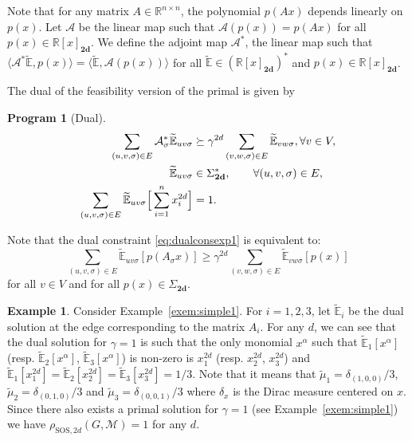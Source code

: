 \documentclass{sig-alternate-05-2015}
\newcommand{\1}{\mathbf{1}}
\newcommand{\Shs}{\Sigma_{\mathbf{2d}}^*}
\newcommand{\la}{\langle}
\newcommand{\ra}{\rangle}
\theoremstyle{definition}
\newtheorem{myexem}{Example}
\newtheorem{myprog}{Program}
\newcommand{\R}{\mathbb{R}}
\newcommand{\A}{\mathcal{M}}
\newcommand{\G}{G}
\newcommand{\jsrsos}[1][2d]{\rho_{\mathrm{SOS},#1}(\G,\A)}
\newcommand{\pE}{\widetilde{\mathbb{E}}}
\newcommand{\pmu}{\widetilde{\mu}}
\newcommand{\Nodes}{V}
\newcommand{\Arcs}{E}
\newcommand{\arc}{edge}
\begin{document}
Note that for any matrix $A \in \R^{n \times n}$, the polynomial $p(A x)$ depends linearly on $p(x)$.
Let $\mathcal{A}$ be the linear map such that $\mathcal{A}(p(x)) = p(Ax)$ for all $p(x) \in \R[x]_{\mathbf{2d}}$.
We define the adjoint map $\mathcal{A}^*$,
the linear map such that $\la \mathcal{A}^* \pE, p(x) \ra = \la \pE, \mathcal{A}(p(x)) \ra$ for all $\pE \in (\R[x]_{\mathbf{2d}})^*$ and $p(x) \in \R[x]_{\mathbf{2d}}$.

The dual of the feasibility version of the primal is given by
\begin{myprog}[Dual]
  \label{prog:dual}
  \begin{align}
    \label{eq:dualconsexp1}
    \sum_{(u,v,\sigma) \in E} \mathcal{A}_\sigma^* \pE_{uv\sigma} & \succeq \gamma^{2d} \sum_{(v,w,\sigma) \in \Arcs} \pE_{vw\sigma}, \forall v \in \Nodes,\\
    \notag
    \pE_{uv\sigma} & \in \Shs, \qquad \forall (u,v,\sigma) \in \Arcs,\\
    \label{eq:dualconsexp3}
    \sum_{(u,v,\sigma) \in E} \pE_{uv\sigma}\Big[\sum_{i=1}^n x_i^{2d}\Big] & = 1.
  \end{align}
\end{myprog}

Note that the dual constraint \eqref{eq:dualconsexp1} is equivalent to:
\begin{equation}
  \label{eq:dualconsexp}
  \sum_{(u,v,\sigma) \in \Arcs} \pE_{uv\sigma}[p(A_\sigma x)] \geq \gamma^{2d} \sum_{(v,w,\sigma) \in \Arcs} \pE_{vw\sigma}[p(x)]
\end{equation}
for all $v \in \Nodes$ and for all $p(x) \in \Sigma_{\mathbf{2d}}$.

\begin{myexem}
  \label{exem:simple2}
  Consider Example~\ref{exem:simple1}.
  For $i = 1, 2, 3$, let $\pE_i$ be the dual solution at the \arc{} corresponding to the matrix $A_i$.
  For any $d$, we can see that the dual solution for $\gamma = 1$ is such that
  the only monomial $x^\alpha$ such that $\pE_1[x^\alpha]$ (resp. $\pE_2[x^\alpha]$, $\pE_3[x^\alpha]$) is non-zero is $x_1^{2d}$ (resp. $x_2^{2d}$, $x_3^{2d}$)
  and $\pE_1[x_1^{2d}] = \pE_2[x_2^{2d}] = \pE_3[x_3^{2d}] = 1/3$.
  Note that it means that $\pmu_1 = \delta_{(1,0,0)}/3$, $\pmu_2 = \delta_{(0,1,0)}/3$ and $\pmu_3 = \delta_{(0,0,1)}/3$
  where $\delta_x$ is the Dirac measure centered on $x$.
  Since there also exists a primal solution for $\gamma = 1$ (see Example~\ref{exem:simple1}) we have $\jsrsos = 1$ for any $d$.
\end{myexem}
\end{document}
